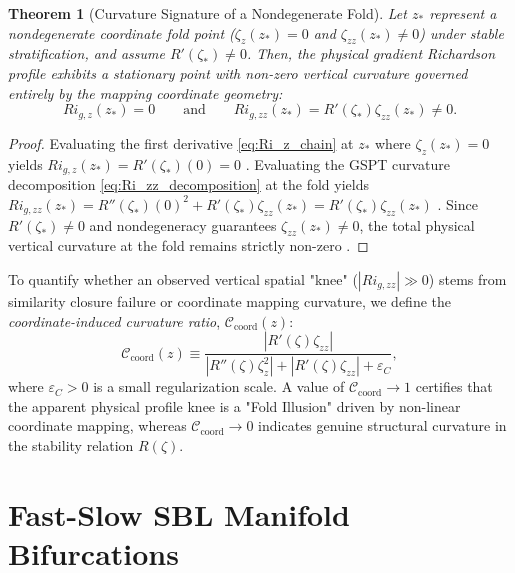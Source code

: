 \documentclass[draft,11pt,twocolumn]{article}
\newtheorem{theorem}{Theorem}
\theoremstyle{definition}
\theoremstyle{remark}
\begin{document}
\begin{theorem}[Curvature Signature of a Nondegenerate Fold]
Let $z_*$ represent a nondegenerate coordinate fold point ($\zeta_z(z_*) = 0$ and $\zeta_{zz}(z_*) \neq 0$) under stable stratification, and assume $R'(\zeta_*) \neq 0$. Then, the physical gradient Richardson profile exhibits a stationary point with non-zero vertical curvature governed entirely by the mapping coordinate geometry:
\begin{equation}
    Ri_{g,z}(z_*) = 0 \qquad \text{and} \qquad Ri_{g,zz}(z_*) = R'(\zeta_*) \zeta_{zz}(z_*) \neq 0. \label{eq:fold_curvature_theorem}
\end{equation}
\end{theorem}

\begin{proof}
Evaluating the first derivative \eqref{eq:Ri_z_chain} at $z_*$ where $\zeta_z(z_*) = 0$ yields $Ri_{g,z}(z_*) = R'(\zeta_*)(0) = 0$ \cite{cases99}. Evaluating the GSPT curvature decomposition \eqref{eq:Ri_zz_decomposition} at the fold yields $Ri_{g,zz}(z_*) = R''(\zeta_*)(0)^2 + R'(\zeta_*) \zeta_{zz}(z_*) = R'(\zeta_*) \zeta_{zz}(z_*)$ \cite{cases99}. Since $R'(\zeta_*) \neq 0$ and nondegeneracy guarantees $\zeta_{zz}(z_*) \neq 0$, the total physical vertical curvature at the fold remains strictly non-zero \cite{cases99}.
\end{proof}

To quantify whether an observed vertical spatial "knee" ($|Ri_{g,zz}| \gg 0$) stems from similarity closure failure or coordinate mapping curvature, we define the \textit{coordinate-induced curvature ratio}, $\mathcal{C}_{\text{coord}}(z)$:
\begin{equation}
    \mathcal{C}_{\text{coord}}(z) \equiv \frac{\left| R'(\zeta) \zeta_{zz} \right|}{\left| R''(\zeta) \zeta_z^2 \right| + \left| R'(\zeta) \zeta_{zz} \right| + \varepsilon_C}, \label{eq:curvature_ratio_def}
\end{equation}
where $\varepsilon_C > 0$ is a small regularization scale. A value of $\mathcal{C}_{\text{coord}} \to 1$ certifies that the apparent physical profile knee is a "Fold Illusion" driven by non-linear coordinate mapping, whereas $\mathcal{C}_{\text{coord}} \to 0$ indicates genuine structural curvature in the stability relation $R(\zeta)$.

\section{Fast-Slow SBL Manifold Bifurcations}
\end{document}
